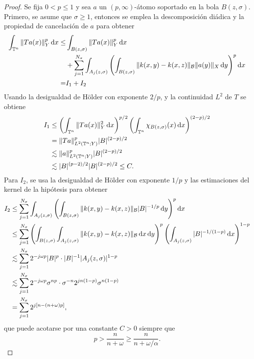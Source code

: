 \begin{proof}
	Se fija $0< p \leq1$ y sea $a$ un $(p,\infty)$-átomo soportado en la bola $B(z,\sigma)$. Primero, se asume que $\sigma\geq1$, entonces se emplea la descomposición diádica y la propiedad de cancelación de $a$ para obtener
	\begin{align*}
		\int_{\mathbb{T}^n}\|Ta(x)\|^p_Y \mathop{}\!\mathrm{d} x \leq & \int_{B(z,\sigma)}\|Ta(x)\|^p_Y \mathop{}\!\mathrm{d} x \\ 
		& + \sum_{j=1}^{N_\sigma} \int_{A_j(z,\sigma)}\left( \int_{B(z,\sigma)} \|k(x, y) - k(x, z)\|_\mathcal{B} \|a(y)\|_X 
		\mathop{}\!\mathrm{d} y\right)^p \mathop{}\!\mathrm{d} x \\
		= & I_1 + I_2
	\end{align*}
	Usando la desigualdad de H\"older con exponente $2/p$, y la continuidad $L^2$ de $T$ se obtiene
	\begin{align*}
		I_1  &\leq \left( \int_{\mathbb{T}^n} \|Ta(x)\|_Y^2\mathop{}\!\mathrm{d} x \right)^{p/2}\left( \int_{\mathbb{T}^n} \chi_{B(z,\sigma)}(x)\mathop{}\!\mathrm{d} x \right)^{(2-p)/2} \\
		 & =  \|Ta\|_{L^2(\mathbb{T}^n;Y)}^p|B|^{(2-p)/2} \\
		 &\lesssim \|a\|_{L^2(\mathbb{T}^n;Y)}^p |B|^{(2-p)/2} \\
		 & \lesssim |B|^{(p-2)/2} |B|^{(2-p)/2}\leq C.
	\end{align*}
	Para $I_2$, se usa la desigualdad de H\"older con exponente $1/p$ y las estimaciones del kernel de la hipótesis para obtener
	\begin{align*}
		I_2  &\leq \sum_{j=1}^{N_\sigma}\int_{A_j(z,\sigma)}\left( \int_{B(z,\sigma)} \|k(x, y) - k(x, z)\|_\mathcal{B} |B|^{-1/p} 
		\mathop{}\!\mathrm{d} y\right)^p \mathop{}\!\mathrm{d} x \\
		 & \leq\sum_{j=1}^{N_\sigma} \left(\int_{B(z,\sigma)} \int_{A_j(z,\sigma)} \|k(x, y) - k(x, z)\|_\mathcal{B} \mathop{}\!\mathrm{d} x\mathop{}\!\mathrm{d} y \right)^p \left( \int_{A_j(z,\sigma)} |B|^{-1/(1-p)} \mathop{}\!\mathrm{d} x \right)^{1-p} \\
		 &\lesssim \sum_{j=1}^{N_\sigma}  2^{-j\omega p}|B|^p \cdot |B|^{-1}|A_j(z, \sigma)|^{1-p} \\
		 &\lesssim \sum_{j=1}^{N_\sigma} 2^{-j\omega p}\sigma^{np} \cdot \sigma^{-n}2^{jn(1-p)}\sigma^{n(1-p)}\\
		 & =\sum_{j=1}^{N_\sigma} 2^{j[n-(n+\omega)p]},
	\end{align*}
	que puede acotarse por una constante $C>0$ siempre que 
	\begin{equation}
		p > \frac{n}{n+\omega} \geq \frac{n}{n+\omega/\alpha}.
		\label{eq:base-p0}
	\end{equation}

\end{proof}
